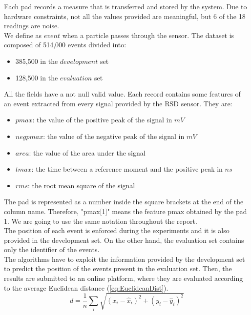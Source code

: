 \documentclass[conference]{IEEEtran}
\begin{document}
Each pad records a measure that is transferred and stored by the system. Due to hardware constraints, not all the values provided are meaningful, but 6 of the 18 readings are noise. \\

We define as $event$ when a particle passes through the sensor. The dataset is composed of 514,000 events divided into:
\begin{itemize}
    \item 385,500 in the $development$ set
    \item 128,500 in the $evaluation$ set
\end{itemize}

All the fields have a not null valid value. Each record contains some features of an event extracted from every signal provided by the RSD sensor. They are:
\begin{itemize}
    \label{lst:typeFeature}
    \item $pmax$: the value of the positive peak of the signal in $mV$
    \item $negpmax$: the value of the negative peak of the signal in $mV$
    \item $area$: the value of the area under the signal
    \item $tmax$: the time between a reference moment and the positive peak in $ns$
    \item $rms$: the root mean square of the signal
\end{itemize}
The pad is represented as a number inside the square brackets at the end of the column name. Therefore, "pmax[1]" means the feature pmax obtained by the pad 1. We are going to use the same notation throughout the report.\\
The position of each event is enforced during the experiments and it is also provided in the development set. On the other hand, the evaluation set contains only the identifier of the events. \\

The algorithms have to exploit the information provided by the development set to predict the position of the events present in the evaluation set. Then, the results are submitted to an online platform, where they are evaluated according to the average Euclidean distance (\ref{eq:EuclideanDist}).
\begin{equation}
    \label{eq:EuclideanDist}
    d=\frac{1}{n} \sum_i \sqrt{(x_i-\hat{x}_i)^2+(y_i-\hat{y}_i)^2}
\end{equation} 
\end{document}
